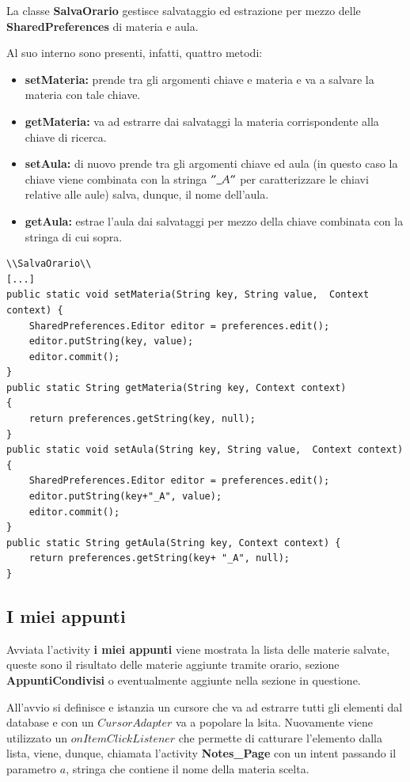 \documentclass[a4paper, 50pt, twoside]{article}
\begin{document}
La classe \textbf{SalvaOrario} gestisce salvataggio ed estrazione per mezzo delle \textbf{SharedPreferences} di materia e aula.

Al suo interno sono presenti, infatti, quattro metodi:
\begin{itemize}
\item \textbf{setMateria:} prende tra gli argomenti chiave e materia e va a salvare la materia con tale chiave.
\item \textbf{getMateria:} va ad estrarre dai salvataggi la materia corrispondente alla chiave di ricerca.
\item \textbf{setAula:} di nuovo prende tra gli argomenti chiave ed aula (in questo caso la chiave viene combinata con la stringa $"\_A"$ per caratterizzare le chiavi relative alle aule) salva, dunque, il nome dell'aula.
\item \textbf{getAula:} estrae l'aula dai salvataggi per mezzo della chiave combinata con la stringa di cui sopra.
\end{itemize}

\begin{lstlisting}
\\SalvaOrario\\
[...]
public static void setMateria(String key, String value,  Context context) {
	SharedPreferences.Editor editor = preferences.edit();
	editor.putString(key, value);
	editor.commit();
}
public static String getMateria(String key, Context context)
{
	return preferences.getString(key, null);
}
public static void setAula(String key, String value,  Context context) {
	SharedPreferences.Editor editor = preferences.edit();
	editor.putString(key+"_A", value);
	editor.commit();
}
public static String getAula(String key, Context context) {
	return preferences.getString(key+ "_A", null);
}
\end{lstlisting}

\newpage
\subsection{I miei appunti}
Avviata l'activity \textbf{i miei appunti} viene mostrata la lista delle materie salvate, queste sono il risultato delle materie aggiunte tramite orario, sezione \textbf{AppuntiCondivisi} o eventualmente aggiunte nella sezione in questione.

All'avvio si definisce e istanzia un cursore che va ad estrarre tutti gli elementi dal database e con un $CursorAdapter$ va a popolare la lsita. Nuovamente viene utilizzato un $onItemClickListener$ che permette di catturare l'elemento dalla lista, viene, dunque, chiamata l'activity \textbf{Notes\_Page} con un intent passando il parametro $a$, stringa che contiene il nome della materia scelta.
\end{document}
